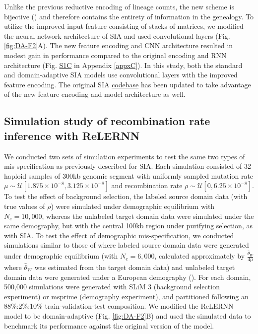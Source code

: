 Unlike the previous reductive encoding of lineage counts, the new scheme is bijective (\cite{kim_distance_2020}) and therefore contains the entirety of information in the genealogy. To utilize the improved input feature consisting of stacks of matrices, we modified the neural network architecture of \ac{SIA} and used convolutional layers (Fig. \ref{fig:DA-F2}A). The new feature encoding and \ac{CNN} architecture resulted in modest gain in performance compared to the original encoding and \ac{RNN} architecture (Fig. \href{https://journals.plos.org/plosgenetics/article?id=10.1371/journal.pgen.1011032#sec018}{S1C} in Appendix \ref{appxC}). In this study, both the standard and domain-adaptive \ac{SIA} models use convolutional layers with the improved feature encoding. The original \ac{SIA} \href{https://github.com/CshlSiepelLab/arg-selection}{codebase} has been updated to take advantage of the new feature encoding and model architecture as well.

\subsection{Simulation study of recombination rate inference with ReLERNN}

We conducted two sets of simulation experiments to test the same two types of mis-specification as previously described for \ac{SIA}. Each simulation consisted of 32 haploid samples of 300kb genomic segment with uniformly sampled mutation rate $\mu \sim \mathcal{U}[1.875\times 10^{-8}, 3.125\times 10^{-8}]$ and recombination rate $\rho \sim \mathcal{U}[0, 6.25\times 10^{-8}]$. To test the effect of background selection, the labeled source domain data (with true values of $\rho$) were simulated under demographic equilibrium with $N_e = 10,000$, whereas the unlabeled target domain data were simulated under the same demography, but with the central 100kb region under purifying selection, as with \ac{SIA}. To test the effect of demographic mis-specification, we conducted simulations similar to those of \cite{adrion_predicting_2020} where labeled source domain data were generated under demographic equilibrium (with $N_e = 6,000$, calculated approximately by $\frac{\hat{\theta}_W}{4\mu}$ where $\hat{\theta}_W$ was estimated from the target domain data) and unlabeled target domain data were generated under a European demography (\cite{tennessen_evolution_2012}). For each domain, 500,000 simulations were generated with SLiM 3 (background selection experiment) or msprime (demography experiment), and partitioned following an 88\%:2\%:10\% train-validation-test composition. We modified the ReLERNN model to be domain-adaptive (Fig. \ref{fig:DA-F2}B) and used the simulated data to benchmark its performance against the original version of the model.

